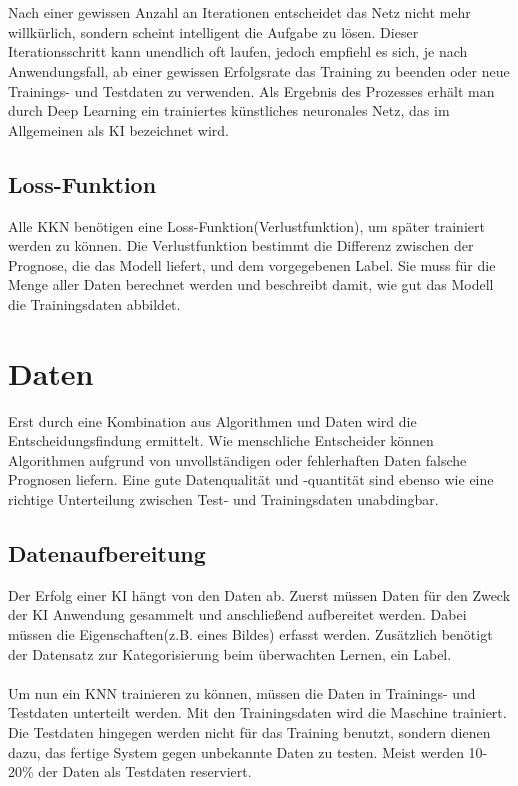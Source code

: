 \documentclass[12pt,oneside,a4paper,parskip]{scrbook}
\begin{document}
\\\\
Nach einer gewissen Anzahl an Iterationen entscheidet das Netz nicht mehr willkürlich, sondern scheint intelligent die Aufgabe zu lösen. Dieser Iterationsschritt kann unendlich oft laufen, jedoch empfiehl es sich, je nach Anwendungsfall, ab einer gewissen Erfolgsrate das Training zu beenden oder neue Trainings- und Testdaten zu verwenden. Als Ergebnis des Prozesses erhält man durch Deep Learning ein trainiertes künstliches neuronales Netz, das im Allgemeinen als KI bezeichnet wird.
\subsection{Loss-Funktion}
\label{section:lossFunction}
Alle KKN benötigen eine Loss-Funktion(Verlustfunktion), um später trainiert werden zu können. Die Verlustfunktion bestimmt die Differenz zwischen der Prognose, die das Modell liefert, und dem vorgegebenen Label. Sie muss für die Menge aller Daten berechnet werden und beschreibt damit, wie gut das Modell die Trainingsdaten abbildet.

\section{Daten}
\label{section:Data}
Erst durch eine Kombination aus Algorithmen und Daten wird die Entscheidungsfindung ermittelt. Wie menschliche Entscheider können Algorithmen aufgrund von unvollständigen oder fehlerhaften Daten falsche Prognosen liefern. Eine gute Datenqualität und -quantität sind ebenso wie eine richtige Unterteilung zwischen Test- und Trainingsdaten unabdingbar.

\subsection{Datenaufbereitung}
\label{section:dataSetup}
Der Erfolg einer KI hängt von den Daten ab. Zuerst müssen Daten für den Zweck der KI Anwendung gesammelt und anschließend aufbereitet werden. Dabei müssen die Eigenschaften(z.B. eines Bildes) erfasst werden. Zusätzlich benötigt der Datensatz zur Kategorisierung beim überwachten Lernen, ein Label.
\\\\
Um nun ein KNN trainieren zu können, müssen die Daten in Trainings- und Testdaten unterteilt werden. Mit den Trainingsdaten wird die Maschine trainiert. Die Testdaten hingegen werden nicht für das Training benutzt, sondern dienen dazu, das fertige System gegen unbekannte Daten zu testen. Meist werden 10-20\% der Daten als Testdaten reserviert.
\end{document}

